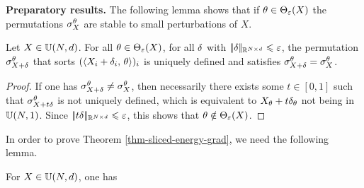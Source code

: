 \medskip
\noindent\textbf{Preparatory results.}  The following lemma shows that if $\theta \in \Theta_\varepsilon(X)$ the permutations $\sigma_X^\theta$ are stable to small perturbations of $X$.

\begin{lem}\label{lem-permutation-unique}
	Let $X \in \mathbb{U}(N,d)$.
	For all $\theta \in \Theta_\varepsilon(X)$, for all $\delta$ with $|\!| \delta |\!|_{\mathbb{R}^{N \times d}} \leqslant \varepsilon$, the permutation 
	$\sigma_{X+\delta}^\theta$ that sorts $( \langle X_i+\delta_i,\,\theta\rangle )_i$
	is uniquely defined and
	satisfies $\sigma_{X+\delta}^\theta = \sigma_X^\theta$.
\end{lem}
\begin{proof}
	If one has  $\sigma_{X+\delta}^\theta \neq \sigma_X^\theta$, then necessarily there exists some $t \in [0,1]$ such that 
	$\sigma_{X+t\delta}^\theta$ is not uniquely defined, which is equivalent to 
	$X_\theta+t\delta_\theta$ not being in $\mathbb{U}(N,1)$. Since $|\!| t \delta |\!|_{\mathbb{R}^{N \times d}} \leqslant \varepsilon$, this shows
	that $\theta \notin \Theta_\varepsilon(X)$.
\end{proof}

In order to prove Theorem \ref{thm-sliced-energy-grad}, we need the following lemma.

\begin{lem}\label{lem-volume}
	For $X \in \mathbb{U}(N, d)$, one has
\end{lem}

